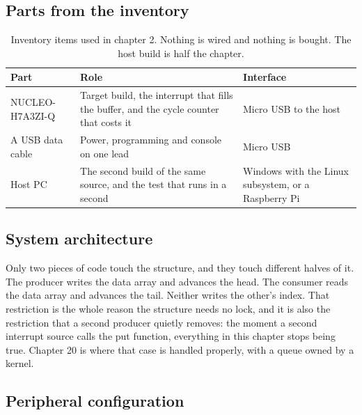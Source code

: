 \subsection*{Parts from the inventory}

\begin{table}[H]\centering\small
\begin{tabular}{p{40mm}p{66mm}p{40mm}}
\toprule
Part & Role & Interface \\
\midrule
NUCLEO-H7A3ZI-Q & Target build, the interrupt that fills the buffer, and the cycle counter that costs it & Micro USB to the host \\
A USB data cable & Power, programming and console on one lead & Micro USB \\
Host PC & The second build of the same source, and the test that runs in a second & Windows with the Linux subsystem, or a Raspberry Pi \\
\bottomrule
\end{tabular}
\caption{Inventory items used in chapter 2. Nothing is wired and nothing is bought. The host build is half the chapter.}
\end{table}

\subsection*{System architecture}


Only two pieces of code touch the structure, and they touch different halves of
it. The producer writes the data array and advances the head. The consumer reads
the data array and advances the tail. Neither writes the other's index. That
restriction is the whole reason the structure needs no lock, and it is also the
restriction that a second producer quietly removes: the moment a second
interrupt source calls the put function, everything in this chapter stops being
true. Chapter 20 is where that case is handled properly, with a queue owned by a
kernel.

\subsection*{Peripheral configuration}

